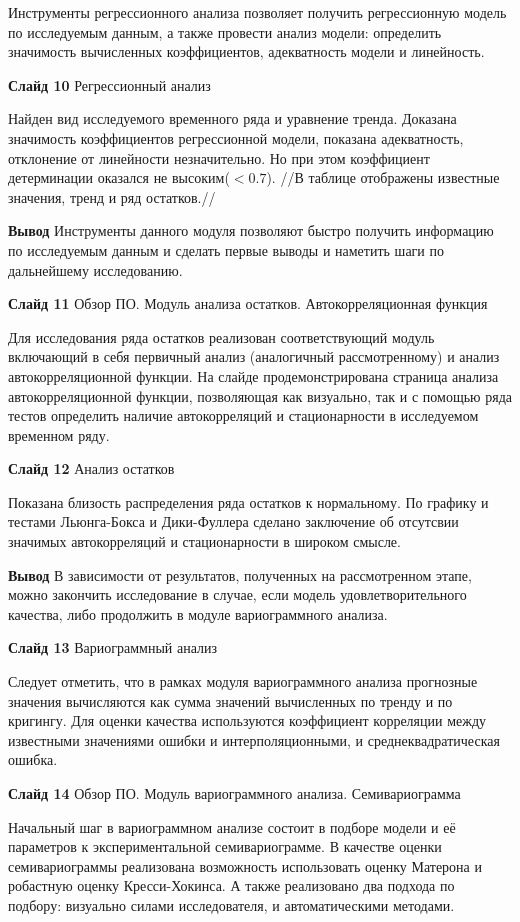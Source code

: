 \documentclass[a4paper,10pt]{report}
\begin{document}
Инструменты регрессионного анализа позволяет получить регрессионную модель по исследуемым данным, а также провести анализ модели: определить значимость вычисленных коэффициентов, адекватность модели и линейность.

\textbf{Слайд 10} Регрессионный анализ

Найден вид исследуемого временного ряда и уравнение тренда. Доказана значимость коэффициентов регрессионной модели, показана адекватность, отклонение от линейности незначительно. Но при этом коэффициент детерминации оказался не высоким($<0.7$). //В таблице отображены известные значения, тренд и ряд остатков.//

\textbf{Вывод} Инструменты данного модуля позволяют быстро получить информацию по исследуемым данным и сделать первые выводы и наметить шаги по дальнейшему исследованию.

\textbf{Слайд 11} Обзор ПО. Модуль анализа остатков. Автокорреляционная функция

Для исследования ряда остатков реализован соответствующий модуль включающий в себя первичный анализ (аналогичный рассмотренному) и анализ автокорреляционной функции. На слайде продемонстрирована страница анализа автокорреляционной функции, позволяющая как визуально, так и с помощью ряда тестов определить наличие автокорреляций и стационарности в исследуемом временном ряду.

\textbf{Слайд 12} Анализ остатков

Показана близость распределения ряда остатков к нормальному. По графику и тестами Льюнга-Бокса и Дики-Фуллера сделано заключение об отсутсвии значимых автокорреляций и стационарности в широком смысле.

\textbf{Вывод} В зависимости от результатов, полученных на рассмотренном этапе, можно закончить исследование в случае, если модель удовлетворительного качества, либо продолжить в модуле вариограммного анализа.

\textbf{Слайд 13} Вариограммный анализ

Следует отметить, что в рамках модуля вариограммного анализа прогнозные значения вычисляются как сумма значений вычисленных по тренду и по кригингу. Для оценки качества используются коэффициент корреляции между известными значениями ошибки и интерполяционными, и среднеквадратическая ошибка.

\textbf{Слайд 14} Обзор ПО. Модуль вариограммного анализа. Семивариограмма

Начальный шаг в вариограммном анализе состоит в подборе модели и её параметров к экспериментальной семивариограмме. В качестве оценки семивариограммы реализована возможность использовать оценку Матерона и робастную оценку Кресси-Хокинса. А также реализовано два подхода по подбору: визуально силами исследователя, и автоматическими методами.
\end{document}
